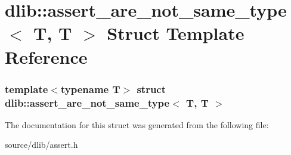 \hypertarget{structdlib_1_1assert__are__not__same__type_3_01T_00_01T_01_4}{
\section{dlib::assert\_\-are\_\-not\_\-same\_\-type$<$ T, T $>$ Struct Template Reference}
\label{structdlib_1_1assert__are__not__same__type_3_01T_00_01T_01_4}
}
\subsubsection*{template$<$typename T$>$ struct dlib::assert\_\-are\_\-not\_\-same\_\-type$<$ T, T $>$}



The documentation for this struct was generated from the following file:\begin{DoxyCompactItemize}
\item 
source/dlib/assert.h\end{DoxyCompactItemize}
